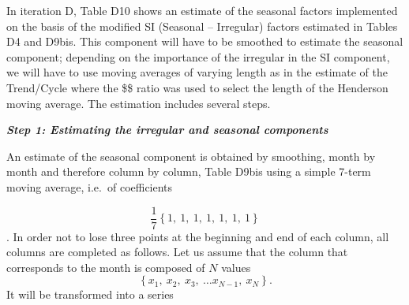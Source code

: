 \documentclass[
  letterpaper,
  DIV=11,
  numbers=noendperiod]{scrreprt}
\begin{document}
In iteration D, Table D10 shows an estimate of the seasonal factors
implemented on the basis of the modified SI (Seasonal -- Irregular)
factors estimated in Tables D4 and D9bis. This component will have to be
smoothed to estimate the seasonal component; depending on the importance
of the irregular in the SI component, we will have to use moving
averages of varying length as in the estimate of the Trend/Cycle where
the \$\$ ratio was used to select the
length of the Henderson moving average. The estimation includes several
steps.

\textbf{\emph{Step 1: Estimating the irregular and seasonal components}}

An estimate of the seasonal component is obtained by smoothing, month by
month and therefore column by column, Table D9bis using a simple 7-term
moving average, i.e.~of coefficients

\[\frac{1}{7} \left\{1,\ 1,\ 1,\ 1,\ 1,\ 1,\ 1\right\}\]. In order not
to lose three points at the beginning and end of each column, all
columns are completed as follows. Let us assume that the column that
corresponds to the month is composed of \(N\) values \[
\left\{ x_{1},\ x_{2},\ x_{3},\ \ldots x_{N - 1},\ x_{N} \right\}.
\] It will be transformed into a series
\end{document}

